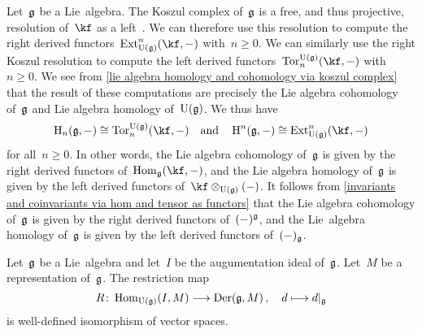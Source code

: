 \begin{fluff}
	Let~$\mathfrak{g}$ be a Lie~algebra.
	The Koszul complex of~$\mathfrak{g}$ is a free, and thus projective, resolution of~$\kf$ as a left~\module{$\Univ(\glie)$}.
	We can therefore use this resolution to compute the right derived functors~$\Ext_{\Univ(\glie)}^n(\kf, \ph)$ with~$n \geq 0$.
	We can similarly use the right Koszul resolution to compute the left derived functors~$\cramped{\Tor^{\Univ(\glie)}_n(\kf, \ph)}$ with~$n \geq 0$.
	We see from \cref{lie algebra homology and cohomology via koszul complex} that the result of these computations are precisely the Lie algebra cohomology of~$\mathfrak{g}$ and Lie algebra homology of~$\Univ(\glie)$.
	We thus have
	\[
		\Homology_n(\glie, \ph)
		\cong
		\Tor^{\Univ(\glie)}_n(\kf, \ph)
		\quad\text{and}\quad
		\Homology^n(\glie, \ph)
		\cong
		\Ext^n_{\Univ(\glie)}(\kf, \ph)
	\]
	for all~$n \geq 0$.
	In other words, the Lie algebra cohomology of~$\mathfrak{g}$ is given by the right derived functors of~$\Hom_{\glie}(\kf, \ph)$, and the Lie algebra homology of~$\mathfrak{g}$ is given by the left derived functors of~$\kf \otimes_{\Univ(\glie)} (\ph)$.
	It follows from \cref{invariants and coinvariants via hom and tensor as functors} that the Lie algebra cohomology of~$\mathfrak{g}$ is given by the right derived functors of~$(-)^{\mathfrak{g}}$, and the Lie~algebra homology of~$\mathfrak{g}$ is given by the left derived functors of~$(-)_{\mathfrak{g}}$.
\end{fluff}


\begin{proposition}
	Let~$\mathfrak{g}$ be a Lie~algebra and let~$I$ be the augumentation ideal of~$\mathfrak{g}$.
	Let~$M$ be a representation of~$\mathfrak{g}$.
	The restriction map
	\[
		R
		\colon
		\Hom_{\Univ(\glie)}(I, M)
		\to
		\Der(\glie, M) \,,
		\index{derivation!of a representation}
		\quad
		d
		\mapsto
		\restrict{d}{\glie}
	\]
	is well-defined isomorphism of vector spaces.
\end{proposition}


